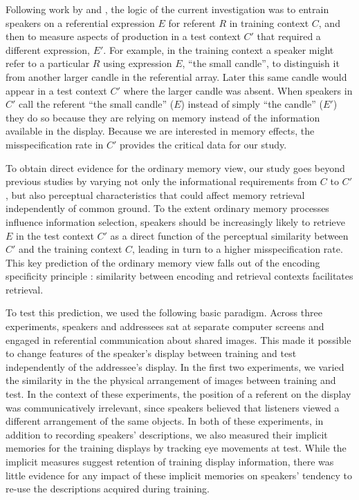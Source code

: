 \documentclass[natbib,man,a4paper]{apa6}
\begin{document}
Following work by \cite{brennanclark96} and \cite{GannBarr2014}, the logic of the current investigation was to entrain speakers on a referential expression \(E\) for referent \(R\) in training context \(C\), and then to measure aspects of production in a test context \(C'\) that required a different expression, \(E'\). For example, in the training context a speaker might refer to a particular \(R\) using expression \(E\), ``the small candle'', to distinguish it from another larger candle in the referential array. Later this same candle would appear in a test context \(C'\) where the larger candle was absent.  When speakers in \(C'\) call the referent ``the small candle'' (\(E\)) instead of simply ``the candle'' (\(E'\)) they do so because they are relying on memory instead of the information available in the display. Because we are interested in memory effects, the misspecification rate in \(C'\) provides the critical data for our study.

To obtain direct evidence for the ordinary memory view, our study goes beyond previous studies by varying not only the informational requirements from \(C\) to \(C'\), but also perceptual characteristics that could affect memory retrieval independently of common ground. To the extent ordinary memory processes influence information selection, speakers should be increasingly likely to retrieve \(E\) in the test context \(C'\) as a direct function of the perceptual similarity between \(C'\) and the training context \(C\), leading in turn to a higher misspecification rate. This key prediction of the ordinary memory view falls out of the encoding specificity principle \citep{tulvingthomson73}: similarity between encoding and retrieval contexts facilitates retrieval. 

To test this prediction, we used the following basic paradigm. Across three experiments, speakers and addressees sat at separate computer screens and engaged in referential communication about shared images.  This made it possible to change features of the speaker's display between training and test independently of the addressee's display. In the first two experiments, we varied the similarity in the the physical arrangement of images between training and test.  In the context of these experiments, the position of a referent on the display was communicatively irrelevant, since speakers believed that listeners viewed a different arrangement of the same objects. In both of these experiments, in addition to recording speakers' descriptions, we also measured their implicit memories for the training displays by tracking eye movements at test. While the implicit measures suggest retention of training display information, there was little evidence for any impact of these implicit memories on speakers' tendency to re-use the descriptions acquired during training.
\end{document}
